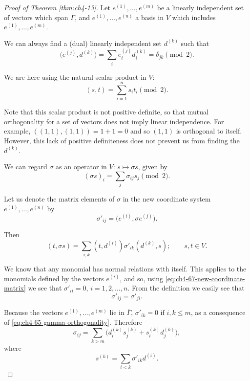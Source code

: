\begin{proof}[Proof of Theorem \ref{thm:ch4-13}]
Let $e^{(1)},\ldots,e^{(m)}$ be a linearly independent set of vectors which
span $\overline\Gamma$, and $e^{(1)},\ldots,e^{(n)}$ a basis in $V$ which
includes $e^{(1)},\ldots,e^{(m)}$.

We can always find a (dual) linearly independent set $d^{(k)}$ such that
\begin{equation}
  \bigl(e^{(j)},d^{(k)}\bigr)=\sum_i e_i^{(j)}d_i^{(k)}=\delta_{jk}\pmod 2.
  \tag{4-66}\label{eq:ch4-66-dual-basis}
\end{equation}

We are here using the natural scalar product in $V$:
\begin{equation*}
  (s,t)=\sum_{i=1}^{n}s_it_i\pmod 2.
\end{equation*}

Note that this scalar product is not positive definite, so that mutual
orthogonality for a set of vectors does not imply linear independence.  For
example, $((1,1),(1,1))=1+1=0$ and so $(1,1)$ is orthogonal to itself.
However, this lack of positive definiteness does not prevent us from finding
the $d^{(k)}$.

We can regard $\sigma$ as an operator in $V$: $s\mapsto\sigma s$, given by
\begin{equation*}
  (\sigma s)_i=\sum_j\sigma_{ij}s_j\pmod 2.
\end{equation*}

Let us denote the matrix elements of $\sigma$ in the new coordinate system
$e^{(1)},\ldots,e^{(n)}$ by
\begin{equation}
  \sigma'_{ij}=\bigl(e^{(i)},\sigma e^{(j)}\bigr).
  \tag{4-67}\label{eq:ch4-67-new-coordinate-matrix}
\end{equation}

Then
\begin{equation}
  (t,\sigma s)=\sum_{i,k}(t,d^{(i)})\sigma'_{ik}(d^{(k)},s);
  \qquad s,t\in V.
  \tag{4-68}\label{eq:ch4-68-coordinate-form}
\end{equation}

We know that any monomial has normal relations with itself.  This applies to
the monomials defined by the vectors $e^{(i)}$, and so, using \eqref{eq:ch4-67-new-coordinate-matrix} we see
that $\sigma'_{ii}=0$, $i=1,2,\ldots,n$.  From the definition we easily see
that
\begin{equation*}
  \sigma'_{ij}=\sigma'_{ji}.
\end{equation*}

Because the vectors $e^{(1)},\ldots,e^{(m)}$ lie in $\overline\Gamma$,
$\sigma'_{ik}=0$ if $i,k\leq m$, as a consequence of \eqref{eq:ch4-65-gamma-orthogonality}.  Therefore
\begin{equation*}
  \sigma_{ij}=\sum_{k>m}
  \bigl(d_i^{(k)}s_j^{(k)}+s_i^{(k)}d_j^{(k)}\bigr),
\end{equation*}
where
\begin{equation*}
  s^{(k)}=\sum_{i<k}\sigma'_{ik}d^{(i)}.
\end{equation*}


\end{proof}
